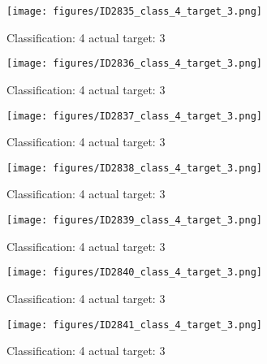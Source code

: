 \begin{figure}[h!]
\begin{center}
\texttt{[image: figures/ID2835\_class\_4\_target\_3.png]}
\end{center}
\caption{ Classification: 4 actual target: 3}
\label{fig:ID2835_class_4_target_3}
\end{figure}
\begin{figure}[h!]
\begin{center}
\texttt{[image: figures/ID2836\_class\_4\_target\_3.png]}
\end{center}
\caption{ Classification: 4 actual target: 3}
\label{fig:ID2836_class_4_target_3}
\end{figure}
\begin{figure}[h!]
\begin{center}
\texttt{[image: figures/ID2837\_class\_4\_target\_3.png]}
\end{center}
\caption{ Classification: 4 actual target: 3}
\label{fig:ID2837_class_4_target_3}
\end{figure}
\begin{figure}[h!]
\begin{center}
\texttt{[image: figures/ID2838\_class\_4\_target\_3.png]}
\end{center}
\caption{ Classification: 4 actual target: 3}
\label{fig:ID2838_class_4_target_3}
\end{figure}
\begin{figure}[h!]
\begin{center}
\texttt{[image: figures/ID2839\_class\_4\_target\_3.png]}
\end{center}
\caption{ Classification: 4 actual target: 3}
\label{fig:ID2839_class_4_target_3}
\end{figure}
\begin{figure}[h!]
\begin{center}
\texttt{[image: figures/ID2840\_class\_4\_target\_3.png]}
\end{center}
\caption{ Classification: 4 actual target: 3}
\label{fig:ID2840_class_4_target_3}
\end{figure}
\begin{figure}[h!]
\begin{center}
\texttt{[image: figures/ID2841\_class\_4\_target\_3.png]}
\end{center}
\caption{ Classification: 4 actual target: 3}
\label{fig:ID2841_class_4_target_3}
\end{figure}
